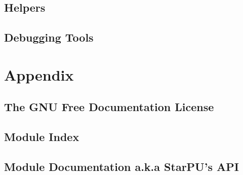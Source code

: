 \chapter{Helpers}
\label{Helpers}
\hypertarget{Helpers}{}


\chapter{Debugging Tools}
\label{DebuggingTools}
\hypertarget{DebuggingTools}{}


\part{Appendix}

\chapter{The GNU Free Documentation License}
\label{GNUFreeDocumentationLicense}
\hypertarget{GNUFreeDocumentationLicense}{}


\chapter{Module Index}


\chapter{Module Documentation a.k.a StarPU's API}
\label{ModuleDocumentation}
\hypertarget{ModuleDocumentation}{}

